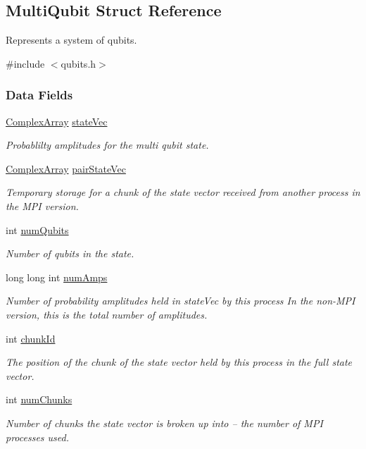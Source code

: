 \hypertarget{structMultiQubit}{}\subsection{Multi\+Qubit Struct Reference}
\label{structMultiQubit}


Represents a system of qubits.  




{\ttfamily \#include $<$qubits.\+h$>$}

\subsubsection*{Data Fields}
\begin{DoxyCompactItemize}
\item 
\hyperlink{structComplexArray}{Complex\+Array} \hyperlink{structMultiQubit_a45483190d6b01ef6b2f98f2bec9ab94f}{state\+Vec}
\begin{DoxyCompactList}\small\item\em Probablilty amplitudes for the multi qubit state. \end{DoxyCompactList}\item 
\hyperlink{structComplexArray}{Complex\+Array} \hyperlink{structMultiQubit_a76f7db4eab52d2b30f58f973ada809c5}{pair\+State\+Vec}
\begin{DoxyCompactList}\small\item\em Temporary storage for a chunk of the state vector received from another process in the M\+PI version. \end{DoxyCompactList}\item 
int \hyperlink{structMultiQubit_ab5b9795bdc6fb5855e1974dcbbaeb36f}{num\+Qubits}
\begin{DoxyCompactList}\small\item\em Number of qubits in the state. \end{DoxyCompactList}\item 
long long int \hyperlink{structMultiQubit_ae16f47d8b725c914fb7f66b6498d79db}{num\+Amps}
\begin{DoxyCompactList}\small\item\em Number of probability amplitudes held in state\+Vec by this process In the non-\/\+M\+PI version, this is the total number of amplitudes. \end{DoxyCompactList}\item 
int \hyperlink{structMultiQubit_ab10c88249fa3825d6227ceec01d37e37}{chunk\+Id}
\begin{DoxyCompactList}\small\item\em The position of the chunk of the state vector held by this process in the full state vector. \end{DoxyCompactList}\item 
int \hyperlink{structMultiQubit_acd43f2f57991709c9e94f73662c972b2}{num\+Chunks}
\begin{DoxyCompactList}\small\item\em Number of chunks the state vector is broken up into -- the number of M\+PI processes used. \end{DoxyCompactList}\end{DoxyCompactItemize}


